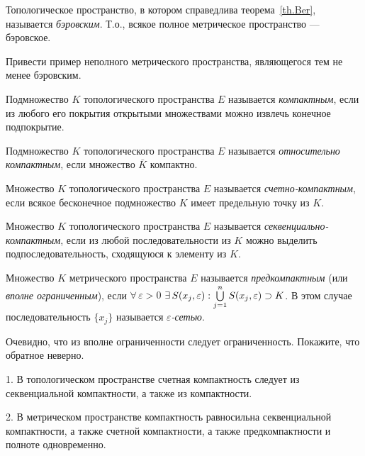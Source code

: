 \documentclass[12pt,titlepage, a4paper]{article}
\begin{document}
Топологическое пространство, в котором справедлива
теорема~\ref{th.Ber}, называется \emph{бэровским}. Т.о., всякое
полное метрическое пространство --- бэровское.

\begin{upr}
Привести пример неполного метрического пространства, являющегося тем
не менее бэровским.
\end{upr}



\begin{defen}
Подмножество $K$ топологического пространства $E$ называется
\emph{компактным}, если из любого его покрытия открытыми множествами
можно извлечь конечное подпокрытие.

Подмножество $K$ топологического пространства $E$ называется
\emph{относительно компактным}, если множество $\bar{K}$ компактно.

Множество $K$ топологического пространства $E$ называется
\emph{счетно-компактным}, если всякое бесконечное подмножество $K$
имеет предельную точку из $K$.

Множество $K$ топологического пространства $E$ называется
\emph{сек\-вен\-ци\-аль\-но-компактным}, если из любой
последовательности из $K$ можно выделить подпоследовательность,
сходящуюся к элементу из $K$.

Множество $K$ метрического пространства $E$ называется
\emph{предкомпак\-тным} (или \emph{вполне ограниченным}), если
$\forall\,\varepsilon>0$
$\exists\,S(x_j,\varepsilon):\bigcup\limits_{j=1}^n
S(x_j,\varepsilon)\p\supset K$. В этом случае последовательность
$\{x_j\}$ называется \emph{$\varepsilon$-сетью}.
\end{defen}

\begin{upr}
Очевидно, что из вполне ограниченности следует ограниченность.
Покажите, что обратное неверно.
\end{upr}
\lecture

\begin{theorem}
1. В топологическом пространстве счетная компактность следует из
секвенциальной компактности, а также из компактности.

2. В метрическом пространстве компактность равносильна
секвенциальной компактности, а также счетной компактности, а также
предкомпактности и полноте одновременно.
\end{theorem}
\end{document}
